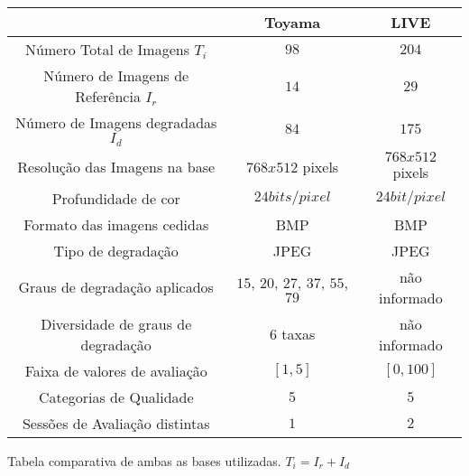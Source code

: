 \begin{minipage}{\linewidth}
\centering
	 \label{tab:bds}
	\begin{tabular}{ c | c | c } %
							&	\textbf{Toyama}			&	\textbf{LIVE} 		\\\hline %
		Número Total de Imagens	$T_i$		&	$98$				&	$204$	  		\\ %
		Número de Imagens de Referência $I_r$	& 	$14$				&	$29$		  	\\
		Número de Imagens degradadas $I_d$	&	$84$				&	$175$	  		\\
		Resolução das Imagens na base		& 	$768 x 512$ pixels 		&	$768 x 512$ pixels 	\\
		Profundidade de cor			&	$24bits/pixel$			&	$24bit/pixel$ 		\\
		Formato das imagens cedidas		&	BMP				&	BMP		  	\\
		Tipo de degradação			&	JPEG				&	JPEG		  	\\
		Graus de degradação aplicados		& $15$, $20$, $27$, $37$, $55$, $79$ 	& 	não informado 		\\
		Diversidade de graus de degradação	&	$6$ taxas			&  	não informado 		\\
		Faixa de valores de avaliação		& 	$[1, 5]$			& 	$[0, 100]$		\\
		Categorias de Qualidade			&	$5$				& 	$5$			\\
		Sessões de Avaliação distintas		&	$1$				& 	$2$			\\
		
	\end {tabular}\par
\bigskip
{\small Tabela comparativa de ambas as bases utilizadas. $T_i = I_r + I_d$}
\end{minipage}
\bigskip

